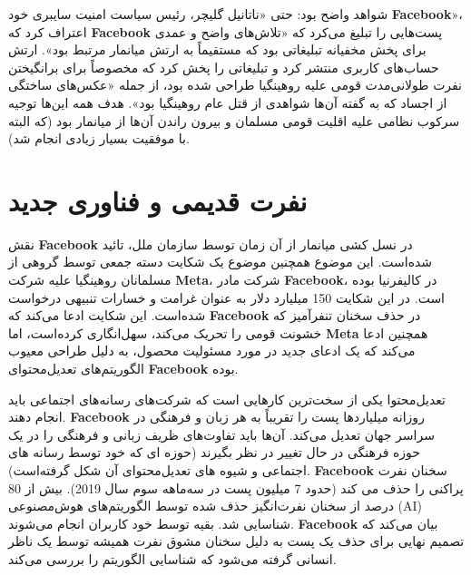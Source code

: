 شواهد واضح بود: حتی «ناتانیل گلیچر، رئیس سیاست امنیت سایبری خود \textenglish{\textbf{Facebook}}»، اعتراف کرد که \textenglish{\textbf{Facebook}} پست‌هایی را تبلیغ می‌کرد که «تلاش‌های واضح و عمدی برای پخش مخفیانه تبلیغاتی بود که مستقیماً به ارتش میانمار مرتبط بود».
ارتش حساب‌های کاربری منتشر کرد و تبلیغاتی را پخش کرد که مخصوصاً برای برانگیختن نفرت طولانی‌مدت قومی علیه روهینگیا طراحی شده بود، از جمله «عکس‌های ساختگی از اجساد که به گفته آن‌ها شواهدی از قتل عام روهینگیا بود».
هدف همه این‌ها توجیه سرکوب نظامی علیه اقلیت قومی مسلمان و بیرون راندن آن‌ها از میانمار بود (که البته با موفقیت بسیار زیادی انجام شد).
\newpage


{
\section*{نفرت قدیمی و فناوری جدید}
\label{sec:نفرت قدیمی و فناوری جدید}
نقش \textenglish{\textbf{Facebook}} در نسل کشی میانمار از آن زمان توسط سازمان ملل، تائید شده‌است. این موضوع همچنین موضوع یک شکایت دسته جمعی توسط گروهی از مسلمانان روهینگیا علیه شرکت \textenglish{\textbf{Meta}}، شرکت مادر \textenglish{\textbf{Facebook}}، در کالیفرنیا بوده است. در این شکایت 150 میلیارد دلار به عنوان غرامت و خسارات تنبیهی درخواست شده‌است. این شکایت ادعا می‌کند که \textenglish{\textbf{Facebook}} در حذف سخنان تنفرآمیز که خشونت قومی را تحریک می‌کند، سهل‌انگاری کرده‌است، اما \textenglish{\textbf{Meta}} همچنین ادعا می‌کند که یک ادعای جدید در مورد مسئولیت محصول، به دلیل طراحی معیوب الگوریتم‌های تعدیل‌محتوای \textenglish{\textbf{Facebook}} بوده.
}
تعدیل‌محتوا یکی از سخت‌ترین کارهایی است که شرکت‌های رسانه‌های اجتماعی باید انجام دهند.
\textenglish{\textbf{Facebook}} روزانه میلیاردها پست را تقریباً به هر زبان و فرهنگی در سراسر جهان تعدیل می‌کند.
آن‌ها باید تفاوت‌های ظریف زبانی و فرهنگی را در یک حوزه فرهنگی در حال تغییر در نظر بگیرند (حوزه ای که خود توسط رسانه های اجتماعی و شیوه های تعدیل‌محتوای آن شکل گرفته‌است).
\textenglish{\textbf{Facebook}} سخنان نفرت پراکنی را حذف می کند (حدود 7 میلیون پست در سه‌ماهه سوم سال 2019).
بیش از 80 درصد از سخنان نفرت‌انگیز حذف شده توسط الگوریتم‌های هوش‌مصنوعی (AI) شناسایی شد.
بقیه توسط خود کاربران انجام می‌شوند.
\textenglish{\textbf{Facebook}} بیان می‌کند که تصمیم نهایی برای حذف یک پست به دلیل سخنان مشوق نفرت همیشه توسط یک ناظر انسانی گرفته می‌شود که شناسایی الگوریتم را بررسی می‌کند.

